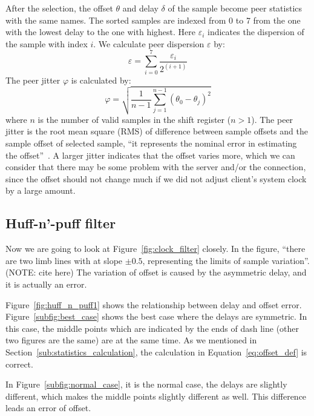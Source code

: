After the selection, the offset $\theta$ and delay $\delta$ of the sample
become peer statistics with the same names. The sorted samples are indexed from
0 to 7 from the one with the lowest delay to the one with highest. Here
$\varepsilon_i$ indicates the dispersion of the sample with index $i$. We
calculate peer dispersion $\varepsilon$ by:
\begin{equation}
    \varepsilon = \sum^{7}_{i=0} \frac{\varepsilon_i}{2^{(i+1)}}
    \label{eq:peer_dispersion}
\end{equation}
The peer jitter $\varphi$ is calculated by:
\begin{equation}
    \varphi = \sqrt{\frac{1}{n-1} \sum^{n-1}_{j=1} (\theta_0 - \theta_j)^2}
    \label{eq:peer_jitter}
\end{equation}
where $n$ is the number of valid samples in the shift register ($n > 1$).
The peer jitter is the root mean square (RMS) of difference between sample
offsets and the sample offset of selected sample, ``it represents the nominal
error in estimating the offset''~\cite{rfc5905}. A larger jitter indicates
that the offset varies more, which we can consider that there may be some
problem with the server and/or the connection, since the offset should not
change much if we did not adjust client's system clock by a large amount.

\subsection{Huff-n'-puff filter}%
\label{sub:huff_n_puff_filter}
Now we are going to look at Figure~\ref{fig:clock_filter} closely. In the
figure, ``there are two limb lines with at slope $\pm0.5$, representing the
limits of sample variation''. (NOTE: cite here) 
The variation of offset is caused by the asymmetric delay, and it is actually
an error.

Figure~\ref{fig:huff_n_puff1} shows the relationship between delay and offset
error.  Figure~\ref{subfig:best_case} shows the best case where the delays are
symmetric. In this case, the middle points which are indicated by the ends of
dash line (other two figures are the same) are at the same time. As we
mentioned in Section~\ref{sub:statistics_calculation}, the calculation in
Equation~\ref{eq:offset_def} is correct. 



In Figure~\ref{subfig:normal_case}, it is the normal case, the delays are
slightly different, which makes the middle points slightly different as well.
This difference leads an error of offset.

